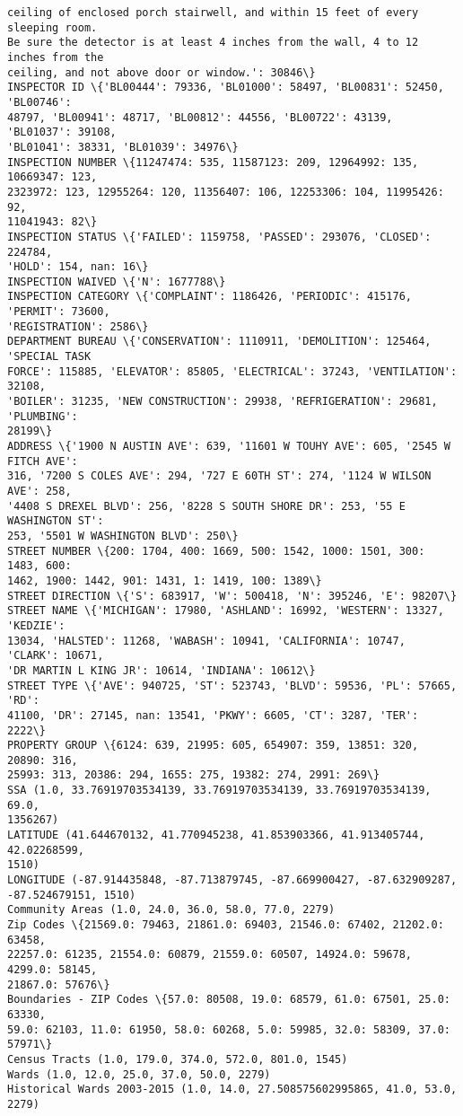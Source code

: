 \documentclass[11pt]{article}
\begin{document}
\begin{Verbatim}[commandchars=\\\{\}]
ceiling of enclosed porch stairwell, and within 15 feet of every sleeping room.
Be sure the detector is at least 4 inches from the wall, 4 to 12 inches from the
ceiling, and not above door or window.': 30846\}
INSPECTOR ID \{'BL00444': 79336, 'BL01000': 58497, 'BL00831': 52450, 'BL00746':
48797, 'BL00941': 48717, 'BL00812': 44556, 'BL00722': 43139, 'BL01037': 39108,
'BL01041': 38331, 'BL01039': 34976\}
INSPECTION NUMBER \{11247474: 535, 11587123: 209, 12964992: 135, 10669347: 123,
2323972: 123, 12955264: 120, 11356407: 106, 12253306: 104, 11995426: 92,
11041943: 82\}
INSPECTION STATUS \{'FAILED': 1159758, 'PASSED': 293076, 'CLOSED': 224784,
'HOLD': 154, nan: 16\}
INSPECTION WAIVED \{'N': 1677788\}
INSPECTION CATEGORY \{'COMPLAINT': 1186426, 'PERIODIC': 415176, 'PERMIT': 73600,
'REGISTRATION': 2586\}
DEPARTMENT BUREAU \{'CONSERVATION': 1110911, 'DEMOLITION': 125464, 'SPECIAL TASK
FORCE': 115885, 'ELEVATOR': 85805, 'ELECTRICAL': 37243, 'VENTILATION': 32108,
'BOILER': 31235, 'NEW CONSTRUCTION': 29938, 'REFRIGERATION': 29681, 'PLUMBING':
28199\}
ADDRESS \{'1900 N AUSTIN AVE': 639, '11601 W TOUHY AVE': 605, '2545 W FITCH AVE':
316, '7200 S COLES AVE': 294, '727 E 60TH ST': 274, '1124 W WILSON AVE': 258,
'4408 S DREXEL BLVD': 256, '8228 S SOUTH SHORE DR': 253, '55 E WASHINGTON ST':
253, '5501 W WASHINGTON BLVD': 250\}
STREET NUMBER \{200: 1704, 400: 1669, 500: 1542, 1000: 1501, 300: 1483, 600:
1462, 1900: 1442, 901: 1431, 1: 1419, 100: 1389\}
STREET DIRECTION \{'S': 683917, 'W': 500418, 'N': 395246, 'E': 98207\}
STREET NAME \{'MICHIGAN': 17980, 'ASHLAND': 16992, 'WESTERN': 13327, 'KEDZIE':
13034, 'HALSTED': 11268, 'WABASH': 10941, 'CALIFORNIA': 10747, 'CLARK': 10671,
'DR MARTIN L KING JR': 10614, 'INDIANA': 10612\}
STREET TYPE \{'AVE': 940725, 'ST': 523743, 'BLVD': 59536, 'PL': 57665, 'RD':
41100, 'DR': 27145, nan: 13541, 'PKWY': 6605, 'CT': 3287, 'TER': 2222\}
PROPERTY GROUP \{6124: 639, 21995: 605, 654907: 359, 13851: 320, 20890: 316,
25993: 313, 20386: 294, 1655: 275, 19382: 274, 2991: 269\}
SSA (1.0, 33.76919703534139, 33.76919703534139, 33.76919703534139, 69.0,
1356267)
LATITUDE (41.644670132, 41.770945238, 41.853903366, 41.913405744, 42.02268599,
1510)
LONGITUDE (-87.914435848, -87.713879745, -87.669900427, -87.632909287,
-87.524679151, 1510)
Community Areas (1.0, 24.0, 36.0, 58.0, 77.0, 2279)
Zip Codes \{21569.0: 79463, 21861.0: 69403, 21546.0: 67402, 21202.0: 63458,
22257.0: 61235, 21554.0: 60879, 21559.0: 60507, 14924.0: 59678, 4299.0: 58145,
21867.0: 57676\}
Boundaries - ZIP Codes \{57.0: 80508, 19.0: 68579, 61.0: 67501, 25.0: 63330,
59.0: 62103, 11.0: 61950, 58.0: 60268, 5.0: 59985, 32.0: 58309, 37.0: 57971\}
Census Tracts (1.0, 179.0, 374.0, 572.0, 801.0, 1545)
Wards (1.0, 12.0, 25.0, 37.0, 50.0, 2279)
Historical Wards 2003-2015 (1.0, 14.0, 27.508575602995865, 41.0, 53.0, 2279)
    \end{Verbatim}

    \begin{center}
    \end{center}
    { \hspace*{\fill} \\}
    

    
    
    
\end{document}
